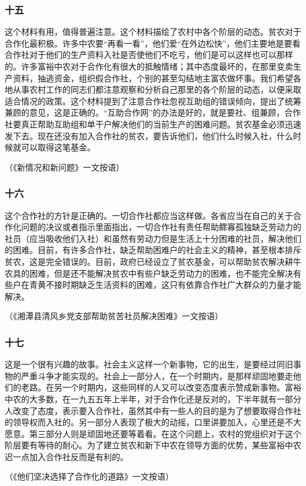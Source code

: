 \documentclass[cn,11pt,chinese]{elegantbook}
\def\myformat#1{\hfil\hfil #1}
\begin{document}
\subsubsection*{\myformat{十五}}
这个材料有用，值得普遍注意。这个材料描绘了农村中各个阶层的动态。贫农对于合作化最积极。许多中农要“再看一看”，他们爱“在外边松快”，他们主要地是要看合作社对于他们的生产资料入社是否使他们不吃亏，他们是可以这样也可以那样的。许多富裕中农对于合作化有很大的抵触情绪；其中态度最坏的，在那里变卖生产资料，抽逃资金，组织假合作社，个别的甚至勾结地主富农做坏事。我们希望各地从事农村工作的同志们都注意观察和分析自己那里的各个阶层的动态，以便采取适合情况的政策。这个材料提到了注意合作社忽视互助组的错误倾向，提出了统筹兼顾的意见，这是正确的。“互助合作网”的办法是好的，就是要社、组兼顾，合作社要真正帮助互助组和单干户解决他们的当前生产的困难问题。贫农基金必须迅速发下去。现在还没有加入合作社的贫农，要告诉他们，他们什么时候入社，什么时候就可以取得这笔基金。\\
\begin{flushright}（《新情况和新问题》一文按语）\end{flushright}
\subsubsection*{\myformat{十六}}
这个合作社的方针是正确的。一切合作社都应当这样做。各省应当在自己的关于合作化问题的决议或者指示里面指出，一切合作社有责任帮助鳏寡孤独缺乏劳动力的社员（应当吸收他们入社）和虽然有劳动力但是生活上十分困难的社员，解决他们的困难。目前，有许多合作社，缺乏帮助困难户的社会主义的精神，甚至根本排斥贫农，这是完全错误的。目前，政府已经设立了贫农基金，可以帮助贫农解决耕牛农具的困难，但是还不能解决贫农中有些户缺乏劳动力的困难，也不能完全解决有些户在青黄不接时期缺乏生活资料的困难，这只有依靠合作社广大群众的力量才能解决。\\
\begin{flushright}（《湘潭县清风乡党支部帮助贫苦社员解决困难》一文按语）\end{flushright}
\subsubsection*{\myformat{十七}}
这是一个很有兴趣的故事。社会主义这样一个新事物，它的出生，是要经过同旧事物的严重斗争才能实现的。社会上一部分人，在一个时期内，是那样顽固地要走他们的老路。在另一个时期内，这些同样的人又可以改变态度表示赞成新事物。富裕中农的大多数，在一九五五年上半年，对于合作化还是反对的，下半年就有一部分人改变了态度，表示要入合作社，虽然其中有一些人的目的是为了想要取得合作社的领导权而入社的。另一部分人表现了极大的动摇，口里讲要加入，心里还是不大愿意。第三部分人则是顽固地还要等着看。在这个问题上，农村的党组织对于这个阶层要有等待的耐心。为了建立贫农和新下中农在领导方面的优势，某些富裕中农迟一点加入合作社反而是有利的。\\
\begin{flushright}（《他们坚决选择了合作化的道路》一文按语）\end{flushright}
\end{document}
